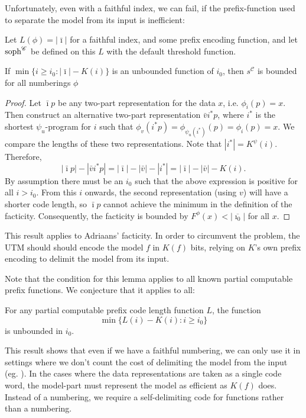 \documentclass{style/llncs}
\newcommand{\C}{\mathscr C}
\newcommand{\tn}[1]{\textnormal{#1}}
\newcommand{\s}{\tn{soph}}
\begin{document}
Unfortunately, even with a faithful index, we can fail, if the prefix-function used to separate the model from its input is inefficient:

\begin{lemma}
Let $L(\phi) = |\bar\imath|$ for a faithful index, and some prefix encoding function, and let $\s^\C$ be defined on this $L$ with the default threshold function.

If $\min\{i\ge i_0:|\bar\imath|-K(i)\}$ is an unbounded function of $i_0$, then $s^\C$ is bounded for all numberings $\phi$
\end{lemma}
\begin{proof}
Let $\bar\imath p$ be any two-part representation for the data $x$, i.e. $\phi_i(p)=x$. Then construct an alternative two-part representation $\bar vi^* p$, where $i^*$ is the shortest $\psi_u$-program for $i$ such that $\phi_v(i^* p)=\phi_{\psi_u(i^*)}(p) = \phi_i(p)=x$. We compare the lengths of these two representations. Note that $|i^*|=K^\psi(i)$. Therefore,
\[
|\bar\imath p|-|\bar v i^* p| = |\bar\imath|-|\bar v| - |i^*| = |\bar\imath|-|\bar v|-K(i).
\]
By assumption there must be an $i_0$ such that the above expression is positive for all $i>i_0$. From this $i$ onwards, the second representation (using $v$) will have a shorter code length, so $\bar\imath p$ cannot achieve the minimum in the definition of the facticity. Consequently, the facticity is bounded by $F^\phi(x)<|\overline{\imath_0}|$ for all $x$. 
\end{proof}
This result applies to Adriaans' facticity\cite{adriaans2012facticity}. In order to circumvent the problem, the UTM should should encode the model $f$ in $K(f)$ bits, relying on $K$'s own prefix encoding to delimit the model from its input. 

Note that the condition for this lemma applies to all known partial computable prefix functions. We conjecture that it applies to all:

\begin{conjecture}
For any partial computable prefix code length function $L$, the function
\[
\min\{L(i)-K(i):i\ge i_0\}
\]
is unbounded in $i_0$.
\end{conjecture}

This result shows that even if we have a faithful numbering, we can only use it in settings where we don't count the cost of delimiting the model from the input (eg. \cite{koppelSoph1988}). In the cases where the data representations are taken as a single code word, the model-part must represent the model as efficient as $K(f)$ does. Instead of a numbering, we require a self-delimiting code for functions rather than a numbering. 
\end{document}

